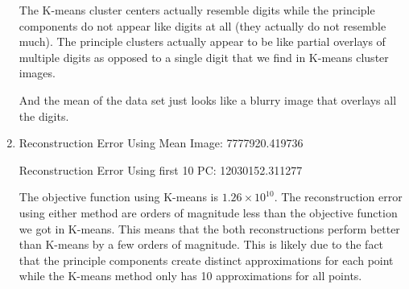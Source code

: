 \documentclass[submit]{harvardml}
\begin{document}
\begin{enumerate}
    The K-means cluster centers actually resemble digits while the principle components do not appear like digits at all (they actually do not resemble much). The principle clusters actually appear to be like partial overlays of multiple digits as opposed to a single digit that we find in K-means cluster images.
    
    
    And the mean of the data set just looks like a blurry image that overlays all the digits. 
    
    
    \item
    Reconstruction Error Using Mean Image: 7777920.419736
    
    Reconstruction Error Using first 10 PC: 12030152.311277

    The objective function using K-means is $1.26\times 10^{10}$. The reconstruction error using either method are orders of magnitude less than the objective function we got in K-means. This means that the both reconstructions perform better than K-means by a few orders of magnitude. This is likely due to the fact that the principle components create distinct approximations for each point while the K-means method only has 10 approximations for all points.
\end{enumerate}
\newpage
\end{document}
